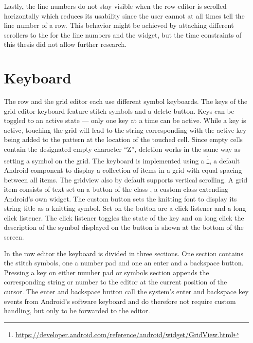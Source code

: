 Lastly, the line numbers do not stay visible when the row editor is scrolled horizontally which reduces its usability since the user cannot at all times tell the line number of a row. This behavior might be achieved by attaching different scrollers to the  for the line numbers and the  widget, but the time constraints of this thesis did not allow further research. 

\section{Keyboard}
The row and the grid editor each use different symbol keyboards. The keys of the grid editor keyboard feature stitch symbols and a delete button. Keys can be toggled to an active state --- only one key at a time can be active. While a key is active, touching the grid will lead to the string corresponding with the active key being added to the pattern at the location of the touched cell. Since empty cells contain the designated empty character ``Z'', deletion works in the same way as setting a symbol on the grid. The keyboard is implemented using a \footnote{\url{https://developer.android.com/reference/android/widget/GridView.html}}, a default Android component to display a collection of items in a grid with equal spacing between all items. The gridview also by default supports vertical scrolling. A grid item consists of text set on a button of the class , a custom class extending Android’s own  widget. The custom button sets the knitting font to display its string title as a knitting symbol. Set on the button are a click listener and a long click listener. The click listener toggles the state of the key and on long click the description of the symbol displayed on the button is shown at the bottom of the screen.

In the row editor the keyboard is divided in three sections. One section contains the stitch symbols, one a number pad and one an enter and a backspace button. Pressing a key on either number pad or symbols section appends the corresponding string or number to the editor at the current position of the cursor. The enter and backspace button call the system’s enter and backspace key events from Android’s software keyboard and do therefore not require custom handling, but only to be forwarded to the editor.

